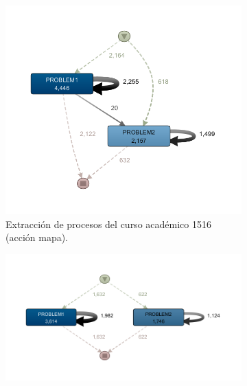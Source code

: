 \begin{figure}[H]
  \begin{subfigure}[t]{0.60\textwidth}
    \includegraphics[width=1.10\textwidth, height=1.10\textwidth]{imagenes/DISCO_map/Dataset FusionadoYear1516.png}
    \caption{Extracción de procesos del curso académico 1516 (acción mapa).}
    \label{fig:mapAño1516}
  \end{subfigure}
  \hfill
  \begin{subfigure}[t]{0.60\textwidth}
    \includegraphics[width=1.10\textwidth, height=0.80\textwidth]{imagenes/DISCO_map/Dataset FusionadoYear1617.png}

\end{subfigure}
\end{figure}
